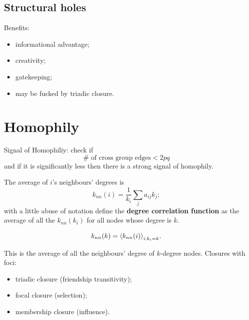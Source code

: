 \documentclass[a4paper,9pt]{extarticle}
\begin{document}
\begin{multicols*}{2}
	\subsection{Structural holes}
	Benefits:
	\begin{itemize}
		\item informational advantage;
		\item creativity;
		\item gatekeeping;
		\item may be fucked by triadic closure.
	\end{itemize}
	\section{Homophily}
	\begin{riquadro}
		Signal of Homophiliy: check if 
		\begin{equation*}
			\#\text{ of cross group edges}<2pq
		\end{equation*}
		and if it is significantly less then there is a strong signal of homophily.
	\end{riquadro}
	The average of $i$'s neighbours' degrees is
	\begin{equation*}
		k_{nn}(i)=\frac{1}{k_{i}}\sum_{j}a_{ij}k_{j};
	\end{equation*}
	with a little abuse of notation define the \textbf{degree correlation function} as the average of all the $k_{nn}\left(k_{i}\right)$ for all nodes whose degree is $k$.
	\begin{riquadro}
		\begin{equation*}
			k_{nn}(k)={\langle k_{nn}(i) \rangle}_{i:k_{i}=k}.
		\end{equation*}
	\end{riquadro}
	This is the average of all the neighbours' degree of $k$-degree nodes.
	Closures with foci:
	\begin{itemize}
		\item triadic closure (friendship transitivity);
		\item focal closure (selection);
		\item membership closure (influence).
	\end{itemize}

\end{multicols*}
\end{document}
